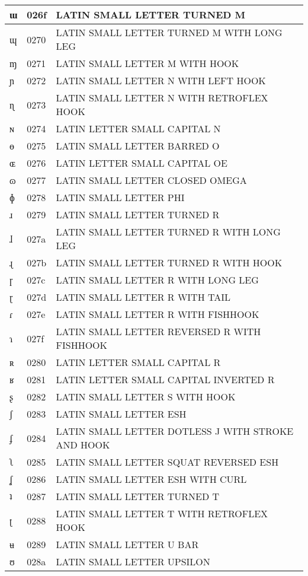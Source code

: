 \documentclass[12pt,letterpaper,openany]{book}
\begin{document}
\begin{center}
\begin{supertabular}{|m{0.25in}|m{0.5in}|m{4in}|}
			ɯ & 026f & LATIN SMALL LETTER TURNED M\\\hline
			ɰ & 0270 & LATIN SMALL LETTER TURNED M WITH LONG LEG\\\hline
			ɱ & 0271 & LATIN SMALL LETTER M WITH HOOK\\\hline
			ɲ & 0272 & LATIN SMALL LETTER N WITH LEFT HOOK\\\hline
			ɳ & 0273 & LATIN SMALL LETTER N WITH RETROFLEX HOOK\\\hline
			ɴ & 0274 & LATIN LETTER SMALL CAPITAL N\\\hline
			ɵ & 0275 & LATIN SMALL LETTER BARRED O\\\hline
			ɶ & 0276 & LATIN LETTER SMALL CAPITAL OE\\\hline
			ɷ & 0277 & LATIN SMALL LETTER CLOSED OMEGA\\\hline
			ɸ & 0278 & LATIN SMALL LETTER PHI\\\hline
			ɹ & 0279 & LATIN SMALL LETTER TURNED R\\\hline
			ɺ & 027a & LATIN SMALL LETTER TURNED R WITH LONG LEG\\\hline
			ɻ & 027b & LATIN SMALL LETTER TURNED R WITH HOOK\\\hline
			ɼ & 027c & LATIN SMALL LETTER R WITH LONG LEG\\\hline
			ɽ & 027d & LATIN SMALL LETTER R WITH TAIL\\\hline
			ɾ & 027e & LATIN SMALL LETTER R WITH FISHHOOK\\\hline
			ɿ & 027f & LATIN SMALL LETTER REVERSED R WITH FISHHOOK\\\hline
			ʀ & 0280 & LATIN LETTER SMALL CAPITAL R\\\hline
			ʁ & 0281 & LATIN LETTER SMALL CAPITAL INVERTED R\\\hline
			ʂ & 0282 & LATIN SMALL LETTER S WITH HOOK\\\hline
			ʃ & 0283 & LATIN SMALL LETTER ESH\\\hline
			ʄ & 0284 & LATIN SMALL LETTER DOTLESS J WITH STROKE AND HOOK\\\hline
			ʅ & 0285 & LATIN SMALL LETTER SQUAT REVERSED ESH\\\hline
			ʆ & 0286 & LATIN SMALL LETTER ESH WITH CURL\\\hline
			ʇ & 0287 & LATIN SMALL LETTER TURNED T\\\hline
			ʈ & 0288 & LATIN SMALL LETTER T WITH RETROFLEX HOOK\\\hline
			ʉ & 0289 & LATIN SMALL LETTER U BAR\\\hline
			ʊ & 028a & LATIN SMALL LETTER UPSILON\\\hline

\end{supertabular}
\end{center}
\end{document}
